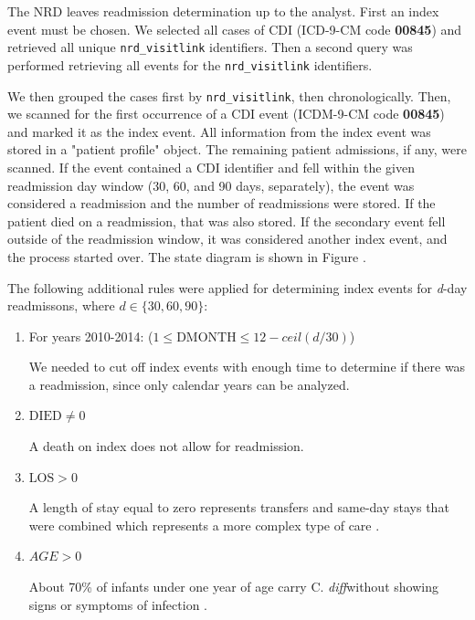 \documentclass[12pt]{ociamthesis}\usepackage[]{graphicx}\usepackage[]{color}
\newcommand{\cdiff}{C. \textit{diff}}
\begin{document}
The NRD leaves readmission determination up to the analyst. First an index event must be chosen. 
We selected all cases of CDI (ICD-9-CM code \textbf{00845}) and retrieved all unique \texttt{nrd\_visitlink}
identifiers. Then a second query was performed retrieving all events for the \texttt{nrd\_visitlink} identifiers.

We then grouped the cases first by \texttt{nrd\_visitlink}, then chronologically. Then, we scanned for the first
occurrence of a CDI event (ICDM-9-CM code \textbf{00845}) and marked it as the index event. All information from
the index event was stored in a "patient profile" object. The remaining patient admissions, if any, were scanned.
If the event contained a CDI identifier and fell within the given readmission day window (30, 60, and 90 days, separately),
the event was considered a readmission and the number of readmissions were stored. If the patient died on a readmission,
that was also stored. If the secondary event fell outside of the readmission window, it was considered another index event, 
and the process started over. The state diagram is shown in Figure \label{fig:readmission-state-diagram}.

The following additional rules were applied for determining index events for \textit{d}-day readmissons, where $d \in \{30, 60, 90\}$:

\begin{enumerate}
    \item For years 2010-2014: ($1 \le \text{DMONTH} \le 12 - ceil(d/30)$)
    
    We needed to cut off index events with enough time to determine if there was a readmission, since only calendar years can be analyzed.
    
    \item $\text{DIED} \ne 0$
    
    A death on index does not allow for readmission.
    
    \item $\text{LOS} > 0$
    
    A length of stay equal to zero represents transfers and same-day stays that were combined which represents a more complex type of care \cite{NRDIntroduction2013}.
    
    \item $AGE > 0$
  
    About 70\% of infants under one year of age carry \cdiff without showing signs or symptoms of infection \cite{Lamont2017}. 
    
\end{enumerate}
\end{document}
